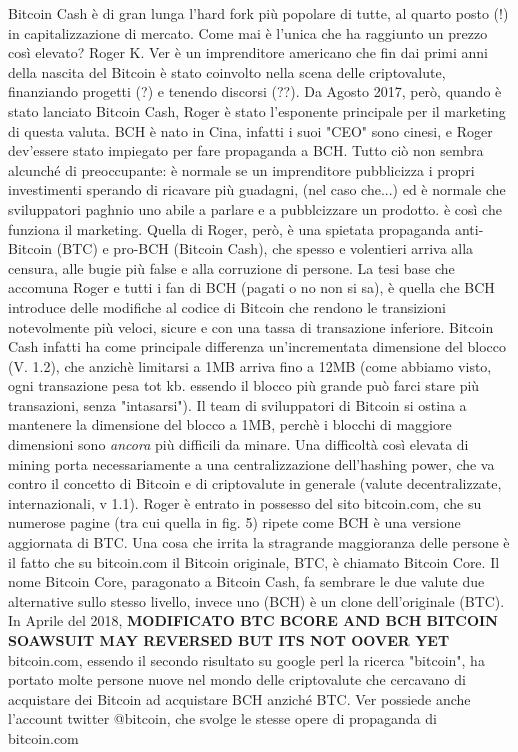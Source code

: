 \documentclass {article}
\begin{document}
{Bitcoin Cash è di gran lunga l'hard fork più popolare di tutte, al quarto posto (!) in capitalizzazione di mercato. Come mai è l'unica che ha raggiunto un prezzo così elevato?
Roger K. Ver è un imprenditore americano che fin dai primi anni della nascita del Bitcoin è stato coinvolto nella scena delle criptovalute, finanziando progetti (?) e tenendo discorsi (??).
Da Agosto 2017, però, quando è stato lanciato Bitcoin Cash, Roger è stato l'esponente principale per il marketing di questa valuta. BCH è nato in Cina, infatti i suoi "CEO" sono cinesi, e Roger dev'essere stato impiegato per fare propaganda a BCH.
Tutto ciò non sembra alcunché di preoccupante: è normale se un imprenditore pubblicizza i propri investimenti sperando di ricavare più guadagni, (nel caso che...) ed è normale che sviluppatori paghnio uno abile a parlare e a pubblcizzare un prodotto.
è così che funziona il marketing.
Quella di Roger, però, è una spietata propaganda anti-Bitcoin (BTC) e pro-BCH (Bitcoin Cash), che spesso e volentieri arriva alla censura, alle bugie più false e alla corruzione di persone.
La tesi base che accomuna Roger e tutti i fan di BCH (pagati o no non si sa), è quella che BCH introduce delle modifiche al codice di Bitcoin che rendono le transizioni notevolmente più veloci, sicure e con una tassa di transazione inferiore. Bitcoin Cash infatti ha come principale differenza un'incrementata dimensione del blocco (V. 1.2), che anzichè limitarsi a 1MB arriva fino a 12MB (come abbiamo visto, ogni transazione pesa tot kb. essendo il blocco più grande può farci stare più transazioni, senza "intasarsi").
Il team di sviluppatori di Bitcoin si ostina a mantenere la dimensione del blocco a 1MB, perchè i blocchi di maggiore dimensioni sono \emph{ancora} più difficili da minare.
Una difficoltà così elevata di mining porta necessariamente a una centralizzazione dell'hashing power, che va contro il concetto di Bitcoin e di criptovalute in generale (valute decentralizzate, internazionali, v 1.1).
Roger è entrato in possesso del sito bitcoin.com, che su numerose pagine (tra cui quella in fig. 5) ripete come BCH è una versione aggiornata di BTC. Una cosa che irrita la stragrande maggioranza delle persone è il fatto che su bitcoin.com il Bitcoin originale, BTC, è chiamato Bitcoin Core.
Il nome Bitcoin Core, paragonato a Bitcoin Cash, fa sembrare le due valute due alternative sullo stesso livello, invece uno (BCH) è un clone dell'originale (BTC).
In Aprile del 2018, \textbf{MODIFICATO BTC BCORE AND BCH BITCOIN SOAWSUIT MAY REVERSED BUT ITS NOT OOVER YET}
bitcoin.com, essendo il secondo risultato su google perl la ricerca "bitcoin", ha portato molte persone nuove nel mondo delle criptovalute che cercavano di acquistare dei Bitcoin ad acquistare BCH anziché BTC.
Ver possiede anche l'account twitter @bitcoin, che svolge le stesse opere di propaganda di bitcoin.com


}
\end{document}
